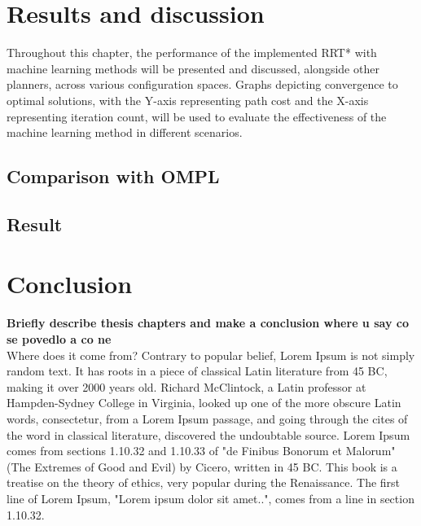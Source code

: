 \documentclass{ctuthesis}
\begin{document}
\chapter{Results and discussion} 
\label{chap:Result} 
Throughout this chapter, 
the performance of the implemented RRT* with machine learning methods will be presented and discussed, 
alongside other planners, across various configuration spaces. 
Graphs depicting convergence to optimal solutions, 
with the Y-axis representing path cost and the X-axis representing iteration count, 
will be used to evaluate the effectiveness of the machine learning method in different scenarios.
\section{Comparison with OMPL}
\section{Result}

\chapter{Conclusion} 
\textbf{Briefly describe thesis chapters and make a conclusion where u say co se povedlo a co ne}
\label{chap:Conclusion}
\\[12pt]
Where does it come from?
Contrary to popular belief, Lorem Ipsum is not simply random text. It has roots in a piece of classical Latin literature from 45 BC, making it over 2000 years old. Richard McClintock, a Latin professor at Hampden-Sydney College in Virginia, looked up one of the more obscure Latin words, consectetur, from a Lorem Ipsum passage, and going through the cites of the word in classical literature, discovered the undoubtable source. Lorem Ipsum comes from sections 1.10.32 and 1.10.33 of "de Finibus Bonorum et Malorum" (The Extremes of Good and Evil) by Cicero, written in 45 BC. This book is a treatise on the theory of ethics, very popular during the Renaissance. The first line of Lorem Ipsum, "Lorem ipsum dolor sit amet..", comes from a line in section 1.10.32.
\end{document}
